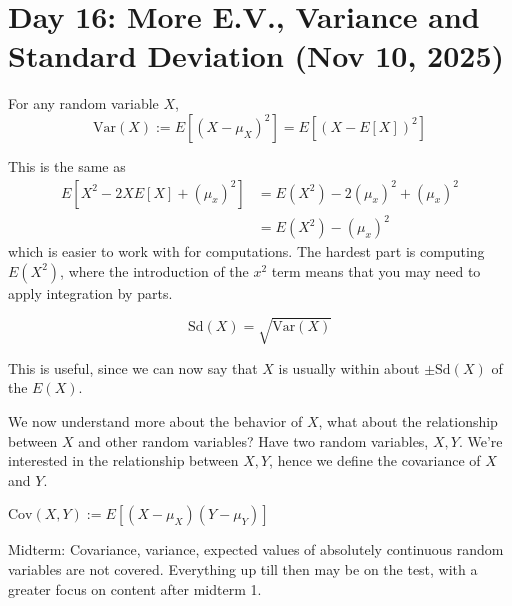 \section{Day 16: More E.V., Variance and Standard Deviation (Nov 10, 2025)}

\begin{definition}[Variance]
    For any random variable $X$, 
    \[
    \text{Var}(X) := E[(X - \mu_X)^2] = E[(X - E[X])^2]
    \]
\end{definition}

\noindent This is the same as 
\begin{align*}
    E[X^2 - 2XE[X] + (\mu_x)^2] &= E(X^2) - 2(\mu_x)^2 + (\mu_x)^2 \\
    &= E(X^2) - (\mu_x)^2
\end{align*}
which is easier to work with for computations. The hardest part is computing $E(X^2)$, where the introduction of the $x^2$ term means that you may need to apply integration by parts.

\begin{definition}
\[
    \text{Sd}(X) = \sqrt{\text{Var}(X)}
\]
\end{definition}

\noindent This is useful, since we can now say that $X$ is usually within about $\pm \text{Sd}(X)$ of the $E(X)$.

We now understand more about the behavior of $X$, what about the relationship between $X$ and other random variables? Have two random variables, $X, Y$. We're interested in the relationship between $X, Y$, hence we define the covariance of $X$ and $Y$. 
\begin{definition}[Covariance]
    $\text{Cov}(X, Y) := E[(X - \mu_X)(Y - \mu_Y)]$
\end{definition}

\noindent Midterm: Covariance, variance, expected values of absolutely continuous random variables are not covered. Everything up till then may be on the test, with a greater focus on content after midterm 1.
